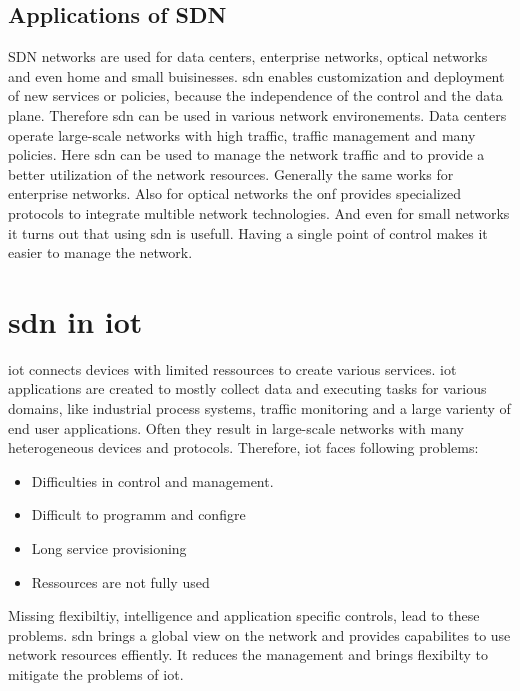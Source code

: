 \documentclass[conference]{IEEEtran}
\begin{document}
	\subsection{Applications of SDN}

	SDN networks are used for data centers, enterprise networks, optical networks and even home and small buisinesses. \ac{sdn} enables customization and deployment of new services or policies, because the independence of the control and the data plane. Therefore \ac{sdn} can be used in various network environements. Data centers operate large-scale networks with high traffic, traffic management and many policies. Here \ac{sdn} can be used to manage the network traffic and to provide a better utilization of the network resources. Generally the same works for enterprise networks. Also for optical networks the \ac{onf} provides specialized protocols to integrate multible network technologies. And even for small networks it turns out that using \ac{sdn} is usefull. Having a single point of control makes it easier to manage the network. \cite{Jefia2018-pj} 



	\section{\ac{sdn} in \ac{iot}}
	\label{section:sdn-iot}

	\acf{iot} connects devices with limited ressources to create various services. \ac{iot} applications are created to mostly collect data and executing tasks for various domains, like industrial process systems, traffic monitoring and a large varienty of end user applications. Often they result in large-scale networks with many heterogeneous devices and protocols. \cite{Li2020-lx} Therefore, \ac{iot} faces following problems: 

	\begin{itemize}
		\item Difficulties in control and management.
		\item Difficult to programm and configre
		\item Long service provisioning
		\item Ressources are not fully used \cite{10.1145/3102304.3102319}
	\end{itemize}

	Missing flexibiltiy, intelligence and application specific controls, lead to these problems. \ac{sdn} brings a global view on the network and provides capabilites to use network resources effiently. It reduces the management and brings flexibilty to mitigate the problems of \ac{iot}.
\end{document}
